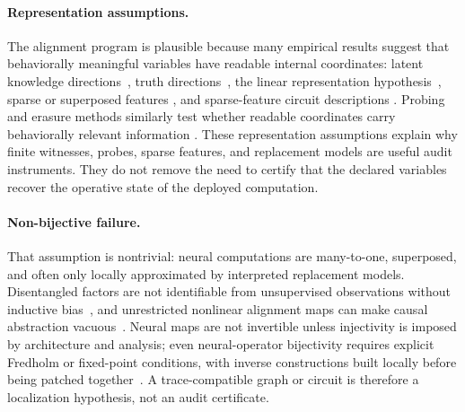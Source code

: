   \paragraph{Representation assumptions.}
  The alignment program is plausible because many empirical results suggest that
  behaviorally meaningful variables have readable internal coordinates: latent
  knowledge directions~\citep{burns2022discovering}, truth
  directions~\citep{marks2024geometry}, the linear representation
  hypothesis~\citep{park2024linear}, sparse or superposed features
  \citep{elhage2022toy}, and sparse-feature circuit descriptions
  \citep{lindsey2025biology}. Probing and erasure methods similarly test whether
  readable coordinates carry behaviorally relevant information
  \citep{ravfogel2020null,elazar2021amnesic}. These representation assumptions
  explain why finite witnesses, probes, sparse features, and replacement models
  are useful audit instruments. They do not remove the need to certify that the
  declared variables recover the operative state of the deployed computation.

  \paragraph{Non-bijective failure.}
  That assumption is nontrivial: neural computations are many-to-one,
  superposed, and often only locally approximated by interpreted replacement
  models. Disentangled factors are not identifiable from unsupervised
  observations without inductive bias~\citep{locatello2019challenging}, and
  unrestricted nonlinear alignment maps can make causal abstraction
  vacuous~\citep{sutter2025nonlinear}. Neural maps are not invertible unless
  injectivity is imposed by architecture and analysis; even neural-operator
  bijectivity requires explicit Fredholm or fixed-point conditions, with inverse
  constructions built locally before being patched
  together~\citep{furuya2023globally}. A trace-compatible graph or circuit is
  therefore a localization hypothesis, not an audit certificate.

